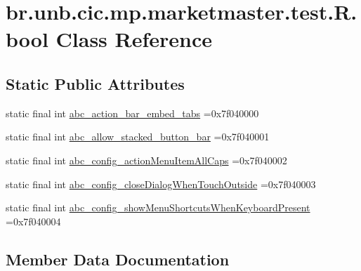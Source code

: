 \hypertarget{classbr_1_1unb_1_1cic_1_1mp_1_1marketmaster_1_1test_1_1R_1_1bool}{}\section{br.\+unb.\+cic.\+mp.\+marketmaster.\+test.\+R.\+bool Class Reference}
\label{classbr_1_1unb_1_1cic_1_1mp_1_1marketmaster_1_1test_1_1R_1_1bool}
\subsection*{Static Public Attributes}
\begin{DoxyCompactItemize}
\item 
static final int \mbox{\hyperlink{classbr_1_1unb_1_1cic_1_1mp_1_1marketmaster_1_1test_1_1R_1_1bool_a0ad6cc79189394f9e56229b7ce487ae0}{abc\+\_\+action\+\_\+bar\+\_\+embed\+\_\+tabs}} =0x7f040000
\item 
static final int \mbox{\hyperlink{classbr_1_1unb_1_1cic_1_1mp_1_1marketmaster_1_1test_1_1R_1_1bool_a592ae54052af2c3a587919ad480ceed5}{abc\+\_\+allow\+\_\+stacked\+\_\+button\+\_\+bar}} =0x7f040001
\item 
static final int \mbox{\hyperlink{classbr_1_1unb_1_1cic_1_1mp_1_1marketmaster_1_1test_1_1R_1_1bool_a403e4388a01b65c82f5c6aaeef53b061}{abc\+\_\+config\+\_\+action\+Menu\+Item\+All\+Caps}} =0x7f040002
\item 
static final int \mbox{\hyperlink{classbr_1_1unb_1_1cic_1_1mp_1_1marketmaster_1_1test_1_1R_1_1bool_aaea2bd51462c5b7bc45ef84d49157a2f}{abc\+\_\+config\+\_\+close\+Dialog\+When\+Touch\+Outside}} =0x7f040003
\item 
static final int \mbox{\hyperlink{classbr_1_1unb_1_1cic_1_1mp_1_1marketmaster_1_1test_1_1R_1_1bool_a7b0b8a29398ffa11c8902f703198d678}{abc\+\_\+config\+\_\+show\+Menu\+Shortcuts\+When\+Keyboard\+Present}} =0x7f040004
\end{DoxyCompactItemize}


\subsection{Member Data Documentation}
\mbox{\label{classbr_1_1unb_1_1cic_1_1mp_1_1marketmaster_1_1test_1_1R_1_1bool_a0ad6cc79189394f9e56229b7ce487ae0}} 
